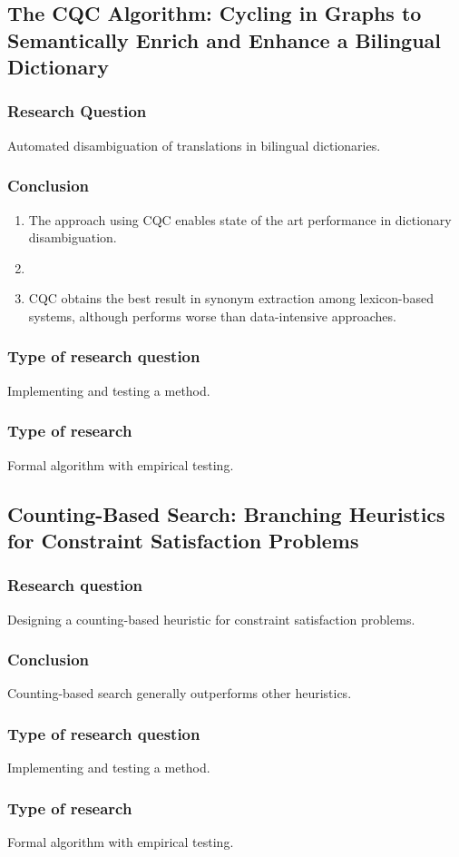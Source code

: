 \documentclass[a4paper, 10pt]{article}
\begin{document}
\subsection{The CQC Algorithm: Cycling in Graphs to Semantically Enrich and Enhance a Bilingual Dictionary}
\subsubsection*{Research Question}
Automated disambiguation of translations in bilingual dictionaries.

\subsubsection*{Conclusion}

\begin{enumerate}
  \item The approach using CQC enables state of the art performance
    in dictionary disambiguation.
  \item 
  \item CQC obtains the best result in synonym extraction among lexicon-based
    systems, although performs worse than data-intensive approaches.
\end{enumerate}

\subsubsection*{Type of research question}
Implementing and testing a method.

\subsubsection*{Type of research}
Formal algorithm with empirical testing.

\subsection{Counting-Based Search: Branching Heuristics for Constraint Satisfaction Problems}
\subsubsection*{Research question}
Designing a counting-based heuristic for constraint satisfaction problems.
\subsubsection*{Conclusion}
Counting-based search generally outperforms other heuristics.

\subsubsection*{Type of research question}
Implementing and testing a method.

\subsubsection*{Type of research}
Formal algorithm with empirical testing.
\end{document}
